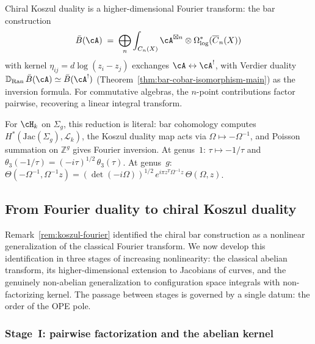 \begin{remark}
\label{rem:koszul-fourier}
Chiral Koszul duality is a higher-dimensional Fourier transform: the bar construction
\[
\bar{B}(\cA) \;=\; \bigoplus_n
  \int_{C_n(X)} \cA^{\boxtimes n}
  \otimes \Omega^*_{\log}(\overline{C}_n(X))
\]
with kernel $\eta_{ij} = d\log(z_i - z_j)$ exchanges $\cA \leftrightarrow \cA^!$, with Verdier duality $\mathbb{D}_{\operatorname{Ran}}\, \bar{B}(\cA) \simeq \bar{B}(\cA^!)$ (Theorem~\ref{thm:bar-cobar-isomorphism-main}) as the inversion formula.  For commutative algebras, the $n$-point contributions factor pairwise, recovering a linear integral transform.

For $\cH_k$ on $\Sigma_g$, this reduction is literal: bar cohomology computes $H^*(\mathrm{Jac}(\Sigma_g), \mathcal{L}_k)$, the Koszul duality map acts via $\Omega \mapsto -\Omega^{-1}$, and Poisson summation on $\mathbb{Z}^g$ gives Fourier inversion.  At genus~$1$: $\tau \mapsto -1/\tau$ and $\theta_3(-1/\tau) = (-i\tau)^{1/2}\,\theta_3(\tau)$.  At genus~$g$: $\Theta(-\Omega^{-1}, \Omega^{-1}z) = (\det(-i\Omega))^{1/2}\, e^{i\pi z^T \Omega^{-1} z}\, \Theta(\Omega, z)$.
\end{remark}

\subsection{From Fourier duality to chiral Koszul duality}
\label{subsec:fourier-to-koszul}

Remark~\ref{rem:koszul-fourier} identified the chiral bar construction
as a nonlinear generalization of the classical Fourier transform.  We
now develop this identification in three stages of increasing
nonlinearity: the classical abelian transform, its higher-dimensional
extension to Jacobians of curves, and the genuinely non-abelian
generalization to configuration space integrals with non-factorizing
kernel.  The passage between stages is governed by a single datum:
the order of the OPE pole.

\subsubsection{Stage~I: pairwise factorization and the abelian kernel}

